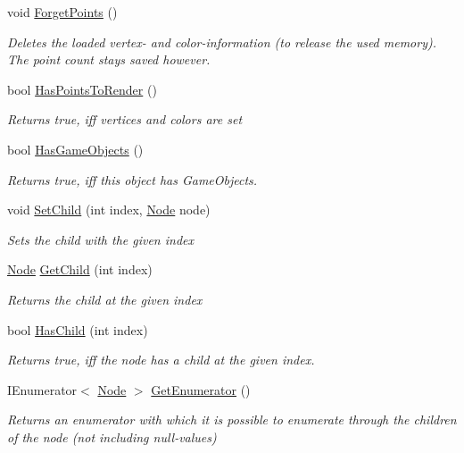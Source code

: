 \begin{DoxyCompactItemize}
void \hyperlink{class_cloud_data_1_1_node_a42cf1e1f98f40a542173abce2b82a078}{Forget\+Points} ()
\begin{DoxyCompactList}\small\item\em Deletes the loaded vertex-\/ and color-\/information (to release the used memory). The point count stays saved however. \end{DoxyCompactList}\item 
bool \hyperlink{class_cloud_data_1_1_node_add8b3fc44e4abc6572f7a723deda352d}{Has\+Points\+To\+Render} ()
\begin{DoxyCompactList}\small\item\em Returns true, iff vertices and colors are set \end{DoxyCompactList}\item 
bool \hyperlink{class_cloud_data_1_1_node_aa253c61651daa14e2377ddb189f56320}{Has\+Game\+Objects} ()
\begin{DoxyCompactList}\small\item\em Returns true, iff this object has Game\+Objects. \end{DoxyCompactList}\item 
void \hyperlink{class_cloud_data_1_1_node_aa4164d93a7380b4f3704c0ac36663164}{Set\+Child} (int index, \hyperlink{class_cloud_data_1_1_node}{Node} node)
\begin{DoxyCompactList}\small\item\em Sets the child with the given index \end{DoxyCompactList}\item 
\hyperlink{class_cloud_data_1_1_node}{Node} \hyperlink{class_cloud_data_1_1_node_a93ba39401d22c904ec3a9631fca1c222}{Get\+Child} (int index)
\begin{DoxyCompactList}\small\item\em Returns the child at the given index \end{DoxyCompactList}\item 
bool \hyperlink{class_cloud_data_1_1_node_a42e31008a7772d196ce770ff2244cc26}{Has\+Child} (int index)
\begin{DoxyCompactList}\small\item\em Returns true, iff the node has a child at the given index. \end{DoxyCompactList}\item 
I\+Enumerator$<$ \hyperlink{class_cloud_data_1_1_node}{Node} $>$ \hyperlink{class_cloud_data_1_1_node_adbc0168d2d1b1c9600c2f91720f00c18}{Get\+Enumerator} ()
\begin{DoxyCompactList}\small\item\em Returns an enumerator with which it is possible to enumerate through the children of the node (not including null-\/values) \end{DoxyCompactList}\item 

\end{DoxyCompactItemize}
